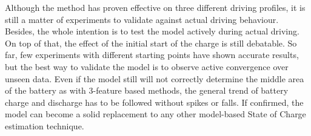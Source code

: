 
%
Although the method has proven effective on three different driving profiles, it is still a matter of experiments to validate against actual driving behaviour.
Besides, the whole intention is to test the model actively during actual driving.
On top of that, the effect of the initial start of the charge is still debatable.
So far, few experiments with different starting points have shown accurate results, but the best way to validate the model is to observe active convergence over unseen data.
Even if the model still will not correctly determine the middle area of the battery as with 3-feature based methods, the general trend of battery charge and discharge has to be followed without spikes or falls.
If confirmed, the model can become a solid replacement to any other model-based State of Charge estimation technique.


